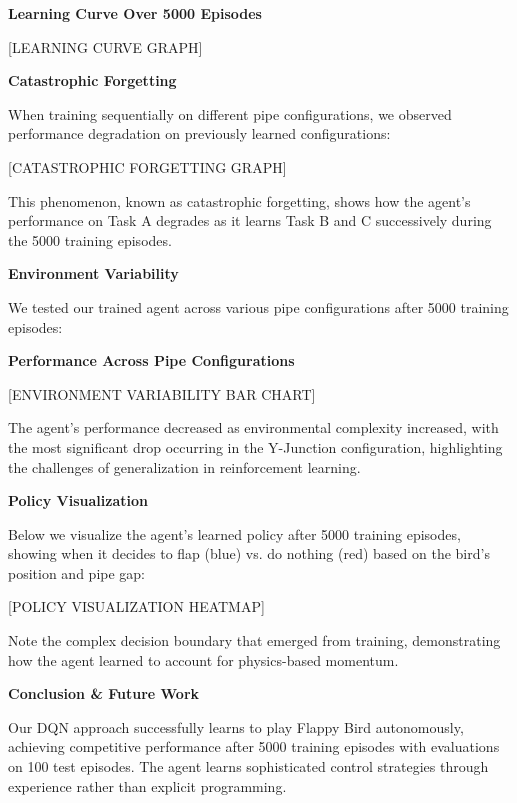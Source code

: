 \documentclass[a1paper,portrait]{article}
\newcommand{\postersection}[1]{
  \vspace{0.5cm}
  \noindent\textcolor{headerblue}{\Large\textbf{#1}}
  \vspace{0.3cm}
}
\begin{document}
\begin{multicols}{3}
\begin{center}
\textbf{Learning Curve Over 5000 Episodes}
\vspace{0.5cm}

[LEARNING CURVE GRAPH]
\end{center}

\postersection{Catastrophic Forgetting}
When training sequentially on different pipe configurations, we observed performance degradation on previously learned configurations:

\begin{center}
[CATASTROPHIC FORGETTING GRAPH]
\end{center}

This phenomenon, known as catastrophic forgetting, shows how the agent's performance on Task A degrades as it learns Task B and C successively during the 5000 training episodes.

\postersection{Environment Variability}
We tested our trained agent across various pipe configurations after 5000 training episodes:

\begin{center}
\textbf{Performance Across Pipe Configurations}

[ENVIRONMENT VARIABILITY BAR CHART]
\end{center}

The agent's performance decreased as environmental complexity increased, with the most significant drop occurring in the Y-Junction configuration, highlighting the challenges of generalization in reinforcement learning.

\postersection{Policy Visualization}
Below we visualize the agent's learned policy after 5000 training episodes, showing when it decides to flap (blue) vs. do nothing (red) based on the bird's position and pipe gap:

\begin{center}
[POLICY VISUALIZATION HEATMAP]
\end{center}

Note the complex decision boundary that emerged from training, demonstrating how the agent learned to account for physics-based momentum.

\postersection{Conclusion \& Future Work}
Our DQN approach successfully learns to play Flappy Bird autonomously, achieving competitive performance after 5000 training episodes with evaluations on 100 test episodes. The agent learns sophisticated control strategies through experience rather than explicit programming.


\end{multicols}
\end{document}

